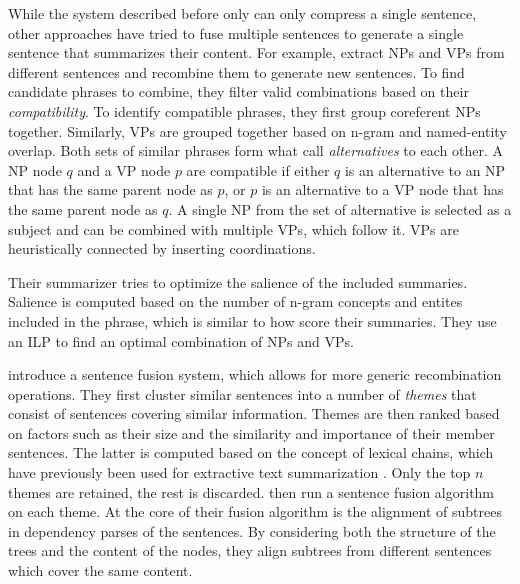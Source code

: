 \documentclass[a4paper,BCOR=10mm]{report}
\numberwithin{lemma}{chapter}
\numberwithin{definition}{chapter}
\begin{document}
While the system described before only can only compress a single sentence, other approaches have tried to fuse multiple sentences to generate a single sentence that summarizes their content.
For example, \citet{bing} extract NPs and VPs from different sentences and recombine them to generate new sentences.
To find candidate phrases to combine, they filter valid combinations based on their \textit{compatibility}. To identify compatible phrases, they first group coreferent NPs together. Similarly, VPs are grouped together based on n-gram and named-entity overlap. Both sets of similar phrases form what \citeauthor{bing} call \textit{alternatives} to each other. A NP node $q$ and a VP node $p$ are compatible if either $q$ is an alternative to an NP that has the same parent node as $p$, or $p$ is an alternative to a VP node that has the same parent node as $q$. A single NP from the set of alternative is selected as a subject and can be combined with multiple VPs, which follow it. VPs are heuristically connected by inserting coordinations.

Their summarizer tries to optimize the salience of the included summaries. Salience is computed based on the number of n-gram concepts and entites included in the phrase, which is similar to how \citet{berg-kirkpatrick} score their summaries.
They use an ILP to find an optimal combination of NPs and VPs.

\citet{barzilay+mckeown} introduce a sentence fusion system, which allows for more generic recombination operations. They first cluster similar sentences into a number of \textit{themes} that consist of sentences covering similar information.
Themes are then ranked based on factors such as their size and the similarity and importance of their member sentences. The latter is computed based on the concept of lexical chains, which have previously been used for extractive text summarization \citep{lexical-chains}. Only the top $n$ themes are retained, the rest is discarded.
\citeauthor{barzilay+mckeown} then run a sentence fusion algorithm on each theme.
At the core of their fusion algorithm is the alignment of subtrees in dependency parses of the sentences.
By considering both the structure of the trees and the content of the nodes, they align subtrees from different sentences which cover the same content.
\end{document}
